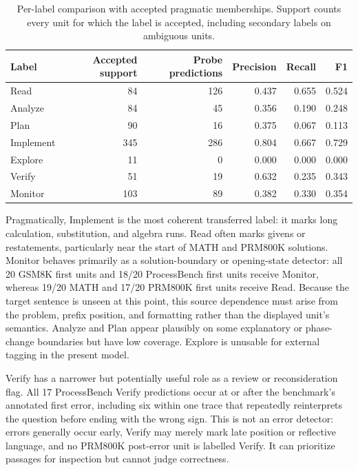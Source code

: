 \begin{table}[t]
\centering
\caption{Per-label comparison with accepted pragmatic memberships.  Support
counts every unit for which the label is accepted, including secondary labels
on ambiguous units.  }
\label{tab:schoenfeld-pragmatic-labels}
\begin{tabular}{lrrrrr}
\toprule
Label & Accepted support & Probe predictions & Precision & Recall & F1 \\
\midrule
Read      &  84 & 126 & 0.437 & 0.655 & 0.524 \\
Analyze   &  84 &  45 & 0.356 & 0.190 & 0.248 \\
Plan      &  90 &  16 & 0.375 & 0.067 & 0.113 \\
Implement & 345 & 286 & 0.804 & 0.667 & 0.729 \\
Explore   &  11 &   0 & 0.000 & 0.000 & 0.000 \\
Verify    &  51 &  19 & 0.632 & 0.235 & 0.343 \\
Monitor   & 103 &  89 & 0.382 & 0.330 & 0.354 \\
\bottomrule
\end{tabular}
\end{table}

Pragmatically, Implement is the most coherent transferred label: it marks
long calculation, substitution, and algebra runs.  Read often marks givens or
restatements, particularly near the start of MATH and PRM800K solutions.
Monitor behaves primarily as a solution-boundary or opening-state detector:
all 20 GSM8K first units and 18/20 ProcessBench first units receive Monitor,
whereas 19/20 MATH and 17/20 PRM800K first units receive Read.  Because the
target sentence is unseen at this point, this source dependence must arise
from the problem, prefix position, and formatting rather than the displayed
unit's semantics.  Analyze and Plan appear plausibly on some explanatory or
phase-change boundaries but have low coverage.  Explore is unusable for
external tagging in the present model.

Verify has a narrower but potentially useful role as a review or
reconsideration flag.  All 17 ProcessBench Verify predictions occur at or
after the benchmark's annotated first error, including six within one trace
that repeatedly reinterprets the question before ending with the wrong sign.
This is not an error detector: errors generally occur early, Verify may merely
mark late position or reflective language, and no PRM800K post-error unit is
labelled Verify.  It can prioritize passages for inspection but cannot judge
correctness.

